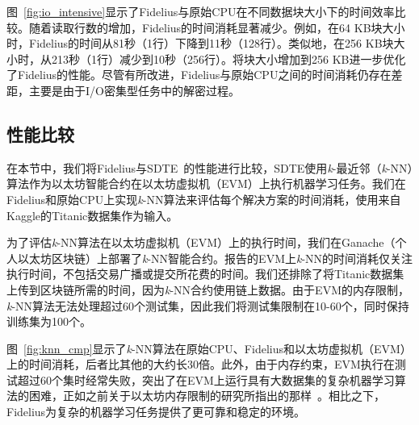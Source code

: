 

图~\ref{fig:io_intensive}显示了Fidelius与原始CPU在不同数据块大小下的时间效率比较。随着读取行数的增加，Fidelius的时间消耗显著减少。例如，在64 KB块大小时，Fidelius的时间从81秒（1行）下降到11秒（128行）。类似地，在256 KB块大小时，从213秒（1行）减少到10秒（256行）。将块大小增加到256 KB进一步优化了Fidelius的性能。尽管有所改进，Fidelius与原始CPU之间的时间消耗仍存在差距，主要是由于I/O密集型任务中的解密过程。

\subsection{性能比较}\label{subsec:evm_cmp}
在本节中，我们将Fidelius与SDTE~\cite{dai2019sdte}的性能进行比较，SDTE使用\textit{k}-最近邻（\textit{k}-NN）算法作为以太坊智能合约在以太坊虚拟机（EVM）上执行机器学习任务。我们在Fidelius和原始CPU上实现\textit{k}-NN算法来评估每个解决方案的时间消耗，使用来自Kaggle的Titanic数据集作为输入。

为了评估\textit{k}-NN算法在以太坊虚拟机（EVM）上的执行时间，我们在Ganache（个人以太坊区块链）上部署了\textit{k}-NN智能合约。报告的EVM上\textit{k}-NN的时间消耗仅关注执行时间，不包括交易广播或提交所花费的时间。我们还排除了将Titanic数据集上传到区块链所需的时间，因为\textit{k}-NN合约使用链上数据。由于EVM的内存限制，\textit{k}-NN算法无法处理超过60个测试集，因此我们将测试集限制在10-60个，同时保持训练集为100个。



图~\ref{fig:knn_cmp}显示了\textit{k}-NN算法在原始CPU、Fidelius和以太坊虚拟机（EVM）上的时间消耗，后者比其他的大约长30倍。此外，由于内存约束，EVM执行在测试超过60个集时经常失败，突出了在EVM上运行具有大数据集的复杂机器学习算法的困难，正如之前关于以太坊内存限制的研究所指出的那样~\cite{dinh2017blockbench}。相比之下，Fidelius为复杂的机器学习任务提供了更可靠和稳定的环境。 